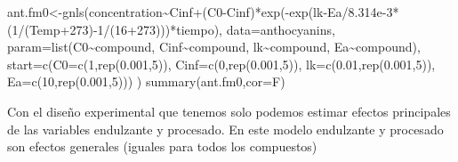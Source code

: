 \documentclass[
]{article}
\newenvironment{Shaded}{\begin{snugshade}}{\end{snugshade}}
\newcommand{\AttributeTok}[1]{\textcolor[rgb]{0.77,0.63,0.00}{#1}}
\newcommand{\DecValTok}[1]{\textcolor[rgb]{0.00,0.00,0.81}{#1}}
\newcommand{\FloatTok}[1]{\textcolor[rgb]{0.00,0.00,0.81}{#1}}
\newcommand{\FunctionTok}[1]{\textcolor[rgb]{0.00,0.00,0.00}{#1}}
\newcommand{\NormalTok}[1]{#1}
\newcommand{\OtherTok}[1]{\textcolor[rgb]{0.56,0.35,0.01}{#1}}
\newcommand{\SpecialCharTok}[1]{\textcolor[rgb]{0.00,0.00,0.00}{#1}}
\begin{document}
\begin{Shaded}
\begin{Highlighting}[]
\NormalTok{ant.fm0}\OtherTok{\textless{}{-}}\FunctionTok{gnls}\NormalTok{(concentration}\SpecialCharTok{\textasciitilde{}}\NormalTok{Cinf}\SpecialCharTok{+}\NormalTok{(C0}\SpecialCharTok{{-}}\NormalTok{Cinf)}\SpecialCharTok{*}\FunctionTok{exp}\NormalTok{(}\SpecialCharTok{{-}}\FunctionTok{exp}\NormalTok{(lk}\SpecialCharTok{{-}}\NormalTok{Ea}\SpecialCharTok{/}\FloatTok{8.314e{-}3}\SpecialCharTok{*}\NormalTok{(}\DecValTok{1}\SpecialCharTok{/}\NormalTok{(Temp}\SpecialCharTok{+}\DecValTok{273}\NormalTok{)}\SpecialCharTok{{-}}\DecValTok{1}\SpecialCharTok{/}\NormalTok{(}\DecValTok{16}\SpecialCharTok{+}\DecValTok{273}\NormalTok{)))}\SpecialCharTok{*}\NormalTok{tiempo),}
              \AttributeTok{data=}\NormalTok{anthocyanins,}
              \AttributeTok{param=}\FunctionTok{list}\NormalTok{(C0}\SpecialCharTok{\textasciitilde{}}\NormalTok{compound,}
\NormalTok{                         Cinf}\SpecialCharTok{\textasciitilde{}}\NormalTok{compound,}
\NormalTok{                         lk}\SpecialCharTok{\textasciitilde{}}\NormalTok{compound,}
\NormalTok{                         Ea}\SpecialCharTok{\textasciitilde{}}\NormalTok{compound),}
              \AttributeTok{start=}\FunctionTok{c}\NormalTok{(}\AttributeTok{C0=}\FunctionTok{c}\NormalTok{(}\DecValTok{1}\NormalTok{,}\FunctionTok{rep}\NormalTok{(}\FloatTok{0.001}\NormalTok{,}\DecValTok{5}\NormalTok{)),}
                      \AttributeTok{Cinf=}\FunctionTok{c}\NormalTok{(}\DecValTok{0}\NormalTok{,}\FunctionTok{rep}\NormalTok{(}\FloatTok{0.001}\NormalTok{,}\DecValTok{5}\NormalTok{)),}
                      \AttributeTok{lk=}\FunctionTok{c}\NormalTok{(}\FloatTok{0.01}\NormalTok{,}\FunctionTok{rep}\NormalTok{(}\FloatTok{0.001}\NormalTok{,}\DecValTok{5}\NormalTok{)),}
                      \AttributeTok{Ea=}\FunctionTok{c}\NormalTok{(}\DecValTok{10}\NormalTok{,}\FunctionTok{rep}\NormalTok{(}\FloatTok{0.001}\NormalTok{,}\DecValTok{5}\NormalTok{)))}
\NormalTok{)}
\FunctionTok{summary}\NormalTok{(ant.fm0,}\AttributeTok{cor=}\NormalTok{F)}
\end{Highlighting}
\end{Shaded}

Con el diseño experimental que tenemos solo podemos estimar efectos
principales de las variables endulzante y procesado. En este modelo
endulzante y procesado son efectos generales (iguales para todos los
compuestos)
\end{document}
